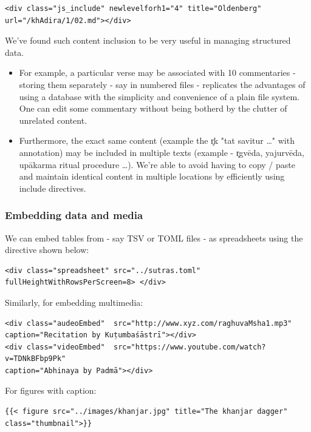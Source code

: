 \documentclass[11pt]{article}
\begin{document}
\begin{verbatim}
<div class="js_include" newlevelforh1="4" title="Oldenberg" url="/khAdira/1/02.md"></div>
\end{verbatim} 

We've found such content inclusion to be very useful in managing structured data. 

\begin{itemize}
\tightlist

\item
For example, a particular verse may be associated with 10 commentaries - storing them separately - say in numbered files - replicates the advantages of using a database with the simplicity and convenience of a plain file system. One can edit some commentary without being botherd by the clutter of unrelated content. 

\item
Furthermore, the exact same content (example the r̥k "tat savitur …" with annotation) may be included in multiple texts (example - r̥gvēda, yajurvēda, upākarma ritual procedure …). We're able to avoid having to copy / paste and maintain identical content in multiple locations by efficiently using include directives. 
\end{itemize}

\subsubsection{Embedding data and media}
We can embed tables from - say TSV or TOML files - as spreadsheets using the directive shown below:

\begin{verbatim}
<div class="spreadsheet" src="../sutras.toml" fullHeightWithRowsPerScreen=8> </div>  
\end{verbatim}

Similarly, for embedding multimedia:
\begin{verbatim}
<div class="audeoEmbed"  src="http://www.xyz.com/raghuvaMsha1.mp3"  
caption="Recitation by Kuṭumbaśāstrī"></div>
<div class="videoEmbed"  src="https://www.youtube.com/watch?v=TDNkBFbp9Pk"  
caption="Abhinaya by Padmā"></div>
\end{verbatim}

For figures with caption:
\begin{verbatim}
{{< figure src="../images/khanjar.jpg" title="The khanjar dagger" class="thumbnail">}}
  
\end{verbatim}
\end{document}
